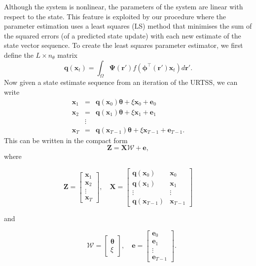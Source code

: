 \documentclass[10pt]{article}
\begin{document}
Although the system is nonlinear, the parameters of the system are linear with respect to the state. This feature is exploited by our procedure where the parameter estimation uses a least squares (LS) method that minimises the sum of the squared errors (of a predicted state update) with each new estimate of the state vector sequence. To create the least squares parameter estimator, we first define the $L \times n_{\theta}$ matrix
\begin{equation}
	\mathbf{q}(\mathbf{x}_t) = \int_\Omega \boldsymbol{\Psi}(\mathbf{r}') f(\boldsymbol{\phi}^{\top}(\mathbf{r}')\mathbf{x}_t) d\mathbf{r}'.
\end{equation}
Now given a state estimate sequence from an iteration of the URTSS, we can write
\begin{eqnarray*}
	\mathbf x_{1} &=& \mathbf{q}(\mathbf x_0) \boldsymbol{\theta}+\xi\mathbf x_0+\mathbf e_0 \\
	\mathbf x_{2} &=& \mathbf{q}(\mathbf x_1) \boldsymbol{\theta}+\xi\mathbf x_1+\mathbf e_1  \\
	&\vdots& \\
	\mathbf x_{T}&=&\mathbf{q}(\mathbf x_{T-1}) \boldsymbol{\theta}+\xi\mathbf x_{T-1}+\mathbf e_{T-1}. 
\end{eqnarray*}
This can be written in the compact form
\begin{equation}
	\mathbf Z=\mathbf X \mathcal W+\mathbf{e}, 
\end{equation}
where
\begin{small}
\begin{equation*}
	\mathbf Z=\left[
	\begin{array}{cccc}
		\mathbf x_{1}\\
		\mathbf x_{2}\\
		\vdots\\
		\mathbf x_{T}
	\end{array}
	\right],\quad \mathbf X=\left[
	\begin{array}{cccc}
		\mathbf q(\mathbf x_0)& \mathbf x_{0}\\
		\mathbf q(\mathbf x_1)& \mathbf x_{1}\\
		\vdots & \vdots\\
		\mathbf q(\mathbf x_{T-1})& \mathbf x_{T-1}
	\end{array}
	\right] 
\end{equation*}
\end{small}
and
\begin{small}
\begin{equation*}
\quad \mathcal W=\left[
	\begin{array}{cc}
		\boldsymbol{\theta} \\
		\xi
	\end{array}
	\right],\quad \mathbf{e}=\left[
	\begin{array}{cccc}
		\mathbf e_0\\
		\mathbf e_1\\
		\vdots\\
		\mathbf e_{T-1}
	\end{array}
	\right].
\end{equation*}
\end{small}
\end{document}
